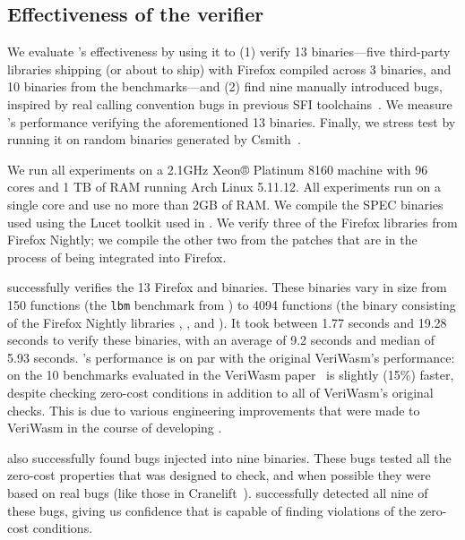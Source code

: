 \subsection{Effectiveness of the \verifname verifier}
\label{subsec:verifier-eval}
%
We evaluate \verifname's effectiveness by using it to (1) verify 13
binaries\dash---five third-party libraries shipping (or about to ship) with
Firefox compiled across 3 binaries, and 10 binaries from the \SPECOhSix
benchmarks\dash---and (2) find nine manually introduced bugs, inspired by real
calling convention bugs in previous SFI toolchains~\cite{cranelift-bug-1177,
nacl-bug-775, nacl-bug-2919}.
%
We measure \verifname's performance verifying the aforementioned 13 binaries.
%
Finally, we stress test \verifname by running it on random binaries generated
by Csmith~\cite{csmith}.


%
We run all \verifname{} experiments on a 2.1GHz \Intel Xeon® Platinum 8160
machine with 96 cores and 1 TB of RAM running Arch Linux 5.11.12.
%
All experiments run on a single core and use no more than 2GB of RAM.
%
We compile the SPEC binaries used using the Lucet toolkit used in
.
%
We verify three of the Firefox libraries from Firefox Nightly;  we compile the
other two from the patches that are in the process of being integrated into
Firefox.

%
\verifname{} successfully verifies the 13 Firefox and \SPECOhSix binaries.
%
These binaries vary in size from 150 functions (the \texttt{lbm} benchmark from
\SPECOhSix) to 4094 functions (the binary consisting of the Firefox Nightly
libraries \libogg, \libgraphite, and \hunspell).
%
It took \verifname between 1.77 seconds and 19.28 seconds to verify these
binaries, with an average of 9.2 seconds and median of 5.93 seconds.
%
\verifname{}'s performance is on par with the original VeriWasm's performance:
on the 10 \SPECOhSix benchmarks evaluated in the VeriWasm
paper~\cite{veriwasm} \verifname{} is slightly (15\%) faster, despite
checking zero-cost conditions in addition to all of VeriWasm's original checks.
%
This is due to various engineering improvements that were made to VeriWasm in
the course of developing \verifname{}.

\verifname also successfully found bugs injected into nine binaries.
%
These bugs tested all the zero-cost properties that \verifname{} was
designed to check, and when possible they were based on real bugs (like those in
Cranelift~\cite{cranelift-bug-1177}).
%
\verifname{} successfully detected all nine of these bugs, giving us confidence
that \verifname{} is capable of finding violations of the zero-cost conditions.


